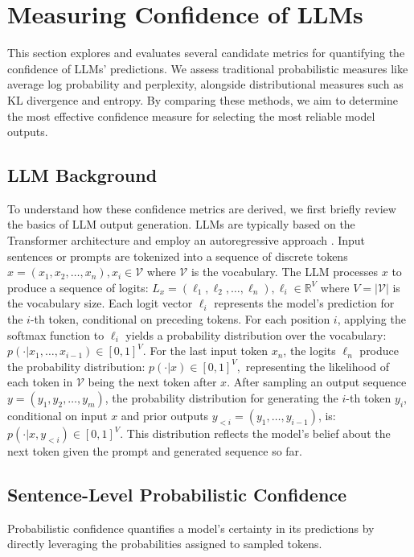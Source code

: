 \section{Measuring Confidence of LLMs} \label{sec:candidate}
This section explores and evaluates several candidate metrics for quantifying the confidence of LLMs' predictions. We assess traditional probabilistic measures like average log probability and perplexity, alongside distributional measures such as KL divergence and entropy. By comparing these methods, we aim to determine the most effective confidence measure for selecting the most reliable model outputs. 

\subsection{LLM Background}
To understand how these confidence metrics are derived, we first briefly review the basics of LLM output generation.  LLMs are typically based on the Transformer architecture and employ an autoregressive approach \cite{vaswani2017attention}. Input sentences or prompts are tokenized into a sequence of discrete tokens  $
x = (x_1, x_2, \dots, x_n), x_i \in \mathcal{V}
$
where $\mathcal{V}$ is the vocabulary. The LLM processes $x$ to produce a sequence of logits:  
$
L_{x} = (\ell_1, \ell_2, \dots, \ell_n), \ell_i \in \mathbb{R}^{V}
$
where $V = |\mathcal{V}|$ is the vocabulary size. Each logit vector $\ell_i$ represents the model's prediction for the $i$-th token, conditional on preceding tokens. For each position $i$, applying the softmax function to $\ell_i$ yields a probability distribution over the vocabulary:  
$
p(\cdot | x_1, \dots, x_{i-1}) \in [0,1]^{V}.
$
For the last input token $x_n$, the logits $\ell_n$ produce the probability distribution:  
$
p(\cdot | x) \in [0,1]^{V},
$
representing the likelihood of each token in $\mathcal{V}$ being the next token after $x$. After sampling an output sequence $y = (y_1, y_2, \dots, y_m)$, the probability distribution for generating the $i$-th token $y_i$, conditional on input $x$ and prior outputs $y_{<i} = (y_1, \dots, y_{i-1})$, is:  
$
p(\cdot | x, y_{<i}) \in [0,1]^{V}.
$
This distribution reflects the model’s belief about the next token given the prompt and generated sequence so far.

\subsection{Sentence-Level Probabilistic Confidence}
Probabilistic confidence quantifies a model's certainty in its predictions by directly leveraging the probabilities assigned to sampled tokens.


